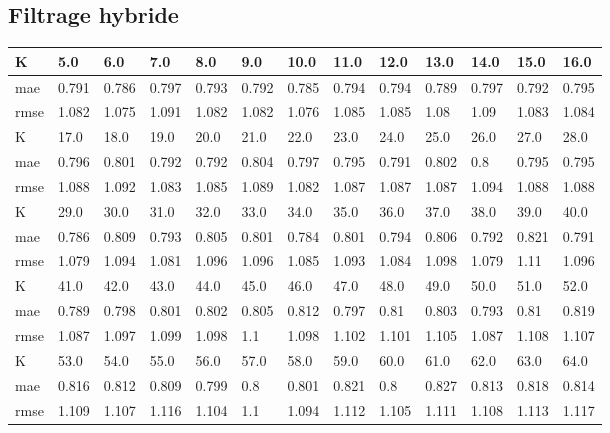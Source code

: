 \begin{appendices}
\subsection*{Filtrage hybride}
\begin{center} 
	\begin{tabularx}{\textwidth}{|l|X|X|X|X|X|X|X|X|X|X|X|X|} 
		\hline 
		K & 5.0 & 6.0 & 7.0 & 8.0 & 9.0 & 10.0 & 11.0 & 12.0 & 13.0 & 14.0 & 15.0 & 16.0 \\ \hline 
		mae & 0.791 & 0.786 & 0.797 & 0.793 & 0.792 & 0.785 & 0.794 & 0.794 & 0.789 & 0.797 & 0.792 & 0.795 \\ \hline 
		rmse & 1.082 & 1.075 & 1.091 & 1.082 & 1.082 & 1.076 & 1.085 & 1.085 & 1.08 & 1.09 & 1.083 & 1.084 \\ \hline 
		\hline 
		K & 17.0 & 18.0 & 19.0 & 20.0 & 21.0 & 22.0 & 23.0 & 24.0 & 25.0 & 26.0 & 27.0 & 28.0 \\ \hline 
		mae & 0.796 & 0.801 & 0.792 & 0.792 & 0.804 & 0.797 & 0.795 & 0.791 & 0.802 & 0.8 & 0.795 & 0.795 \\ \hline 
		rmse & 1.088 & 1.092 & 1.083 & 1.085 & 1.089 & 1.082 & 1.087 & 1.087 & 1.087 & 1.094 & 1.088 & 1.088 \\ \hline 
		\hline 
		K & 29.0 & 30.0 & 31.0 & 32.0 & 33.0 & 34.0 & 35.0 & 36.0 & 37.0 & 38.0 & 39.0 & 40.0 \\ \hline 
		mae & 0.786 & 0.809 & 0.793 & 0.805 & 0.801 & 0.784 & 0.801 & 0.794 & 0.806 & 0.792 & 0.821 & 0.791 \\ \hline 
		rmse & 1.079 & 1.094 & 1.081 & 1.096 & 1.096 & 1.085 & 1.093 & 1.084 & 1.098 & 1.079 & 1.11 & 1.096 \\ \hline 
		\hline 
		K & 41.0 & 42.0 & 43.0 & 44.0 & 45.0 & 46.0 & 47.0 & 48.0 & 49.0 & 50.0 & 51.0 & 52.0 \\ \hline 
		mae & 0.789 & 0.798 & 0.801 & 0.802 & 0.805 & 0.812 & 0.797 & 0.81 & 0.803 & 0.793 & 0.81 & 0.819 \\ \hline 
		rmse & 1.087 & 1.097 & 1.099 & 1.098 & 1.1 & 1.098 & 1.102 & 1.101 & 1.105 & 1.087 & 1.108 & 1.107 \\ \hline 
		\hline 
		K & 53.0 & 54.0 & 55.0 & 56.0 & 57.0 & 58.0 & 59.0 & 60.0 & 61.0 & 62.0 & 63.0 & 64.0 \\ \hline 
		mae & 0.816 & 0.812 & 0.809 & 0.799 & 0.8 & 0.801 & 0.821 & 0.8 & 0.827 & 0.813 & 0.818 & 0.814 \\ \hline 
		rmse & 1.109 & 1.107 & 1.116 & 1.104 & 1.1 & 1.094 & 1.112 & 1.105 & 1.111 & 1.108 & 1.113 & 1.117 \\ \hline 

\end{tabularx}
\end{center}
\end{appendices}
